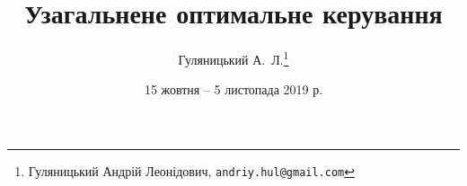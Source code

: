 
\usepackage[explicit]{hulianytskyi}

\title{Узагальнене оптимальне керування}
\author{Гуляницький А.~Л.\footnote{Гуляницький Андрій Леонідович, \texttt{andriy.hul@gmail.com}}}
\date{15 жовтня -- 5 листопада 2019 р.}
\maketitle
\tableofcontents
\thispagestyle{empty}
\setcounter{section}{1}






